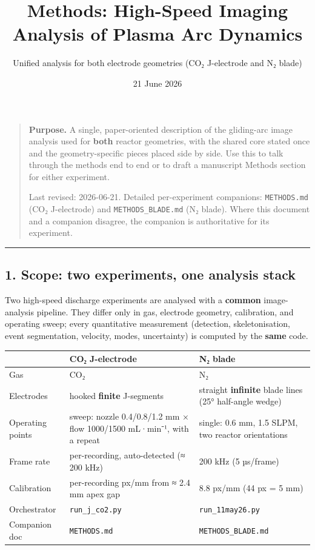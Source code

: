 \documentclass[
  11pt,
]{article}
\title{Methods: High-Speed Imaging Analysis of Plasma Arc Dynamics}
\subtitle{Unified analysis for both electrode geometries (CO₂
J-electrode and N₂ blade)}
\author{}
\date{21 June 2026}
\begin{document}
\maketitle

{
\hypersetup{linkcolor=}
\setcounter{tocdepth}{2}
\tableofcontents
}
\begin{quote}
\textbf{Purpose.} A single, paper-oriented description of the
gliding-arc image analysis used for \textbf{both} reactor geometries,
with the shared core stated once and the geometry-specific pieces placed
side by side. Use this to talk through the methods end to end or to
draft a manuscript Methods section for either experiment.

Last revised: 2026-06-21. Detailed per-experiment companions:
\texttt{METHODS.md} (CO₂ J-electrode) and \texttt{METHODS\_BLADE.md} (N₂
blade). Where this document and a companion disagree, the companion is
authoritative for its experiment.
\end{quote}

\begin{center}\rule{0.5\linewidth}{0.5pt}\end{center}

\hypertarget{1-scope-two-experiments-one-analysis-stack}{%
\subsection{1. Scope: two experiments, one analysis
stack}\label{1-scope-two-experiments-one-analysis-stack}}

Two high-speed discharge experiments are analysed with a \textbf{common}
image- analysis pipeline. They differ only in gas, electrode geometry,
calibration, and operating sweep; every quantitative measurement
(detection, skeletonisation, event segmentation, velocity, modes,
uncertainty) is computed by the \textbf{same} code.

\begin{longtable}[]{@{}lll@{}}
\toprule
& \textbf{CO₂ J-electrode} & \textbf{N₂ blade}\tabularnewline
\midrule
\endhead
Gas & CO₂ & N₂\tabularnewline
Electrodes & hooked \textbf{finite} J-segments & straight
\textbf{infinite} blade lines (25° half-angle wedge)\tabularnewline
Operating points & sweep: nozzle 0.4/0.8/1.2 mm × flow 1000/1500
mL·min⁻¹, with a repeat & single: 0.6 mm, 1.5 SLPM, two reactor
orientations\tabularnewline
Frame rate & per-recording, auto-detected (≈ 200 kHz) & 200 kHz (5
µs/frame)\tabularnewline
Calibration & per-recording px/mm from ≈ 2.4 mm apex gap & 8.8 px/mm (44
px = 5 mm)\tabularnewline
Orchestrator & \texttt{run\_j\_co2.py} &
\texttt{run\_11may26.py}\tabularnewline
Companion doc & \texttt{METHODS.md} &
\texttt{METHODS\_BLADE.md}\tabularnewline
\bottomrule
\end{longtable}
\end{document}
